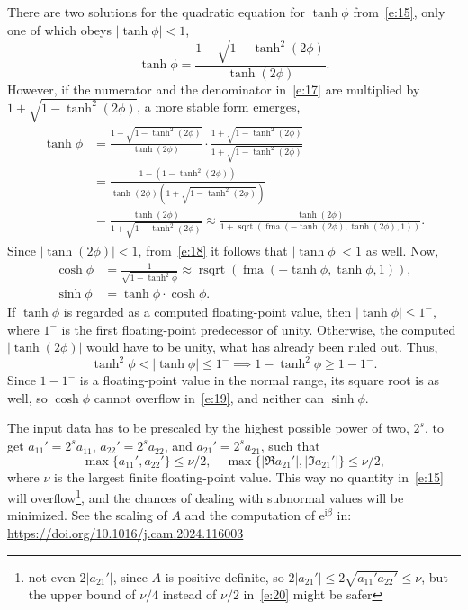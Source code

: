 \documentclass[a4paper,12pt,twoside]{article}
\begin{document}
There are two solutions for the quadratic equation for $\tanh\phi$
from~\eqref{e:15}, only one of which obeys $|\tanh\phi|<1$,
\begin{equation}
  \tanh\phi=\frac{1-\sqrt{1-\tanh^2(2\phi)}}{\tanh(2\phi)}.
  \label{e:17}
\end{equation}
However, if the numerator and the denominator in~\eqref{e:17} are
multiplied by $1+\sqrt{1-\tanh^2(2\phi)}$, a more stable form emerges,
\begin{equation}
  \begin{split}
    \tanh\phi&=\frac{1-\sqrt{1-\tanh^2(2\phi)}}{\tanh(2\phi)}\cdot\frac{1+\sqrt{1-\tanh^2(2\phi)}}{1+\sqrt{1-\tanh^2(2\phi)}}\\
    &=\frac{1-(1-\tanh^2(2\phi))}{\tanh(2\phi)\left(1+\sqrt{1-\tanh^2(2\phi)}\right)}\\
    &=\frac{\tanh(2\phi)}{1+\sqrt{1-\tanh^2(2\phi)}}\approx\frac{\tanh(2\phi)}{1+\mathop{\mathrm{sqrt}}(\mathop{\mathrm{fma}}(-\tanh(2\phi),\tanh(2\phi),1))}.
  \end{split}
  \label{e:18}
\end{equation}
Since $|\tanh(2\phi)|<1$, from~\eqref{e:18} it follows that
$|\tanh\phi|<1$ as well.  Now,
\begin{equation}
  \begin{aligned}
    \cosh\phi&=\frac{1}{\sqrt{1-\tanh^2\phi}}\approx\mathop{\mathrm{rsqrt}}(\mathop{\mathrm{fma}}(-\tanh\phi,\tanh\phi,1)),\\
    \sinh\phi&=\tanh\phi\cdot\cosh\phi.
  \end{aligned}
  \label{e:19}
\end{equation}
If $\tanh\phi$ is regarded as a computed floating-point value, then
$|\tanh\phi|\le 1^-$, where $1^-$ is the first floating-point
predecessor of unity.  Otherwise, the computed $|\tanh(2\phi)|$ would
have to be unity, what has already been ruled out.  Thus,
\begin{displaymath}
  \tanh^2\phi<|\tanh\phi|\le 1^-\implies 1-\tanh^2\phi\ge 1-1^-.
\end{displaymath}
Since $1-1^-$ is a floating-point value in the normal range, its
square root is as well, so $\cosh\phi$ cannot overflow
in~\eqref{e:19}, and neither can $\sinh\phi$.

The input data has to be prescaled by the highest possible power of
two, $2^s$, to get $a_{11}'=2^s a_{11}^{}$, $a_{22}'=2^s a_{22}^{}$,
and $a_{21}'=2^s a_{21}^{}$, such that
\begin{equation}
  \max\{a_{11}',a_{22}'\}\le\nu/2,\quad
  \max\{|\Re{a_{21}'}|,|\Im{a_{21}'}|\}\le\nu/2,
  \label{e:20}
\end{equation}
where $\nu$ is the largest finite floating-point value.  This way no
quantity in~\eqref{e:15} will overflow\footnote{not even $2|a_{21}'|$,
since $A$ is positive definite, so
$2|a_{21}'|\le 2\sqrt{a_{11}'a_{22}'}\le\nu$, but the upper bound of
$\nu/4$ instead of $\nu/2$ in~\eqref{e:20} might be safer}, and the
chances of dealing with subnormal values will be minimized.  See the
scaling of $A$ and the computation of $\mathrm{e}^{\mathrm{i}\beta}$
in:\\\url{https://doi.org/10.1016/j.cam.2024.116003}
\end{document}
